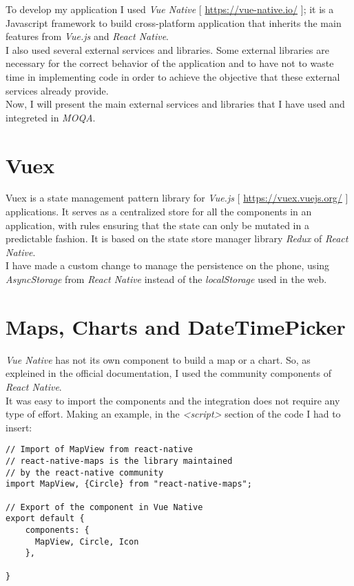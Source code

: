 To develop my application I used \textit{Vue Native} [ \url{https://vue-native.io/} ]; it is a Javascript framework to build cross-platform application that inherits the main features from \textit{Vue.js} and \textit{React Native}.\\ 

I also used several external services and libraries.
Some external libraries are necessary for the correct behavior of the application and to have not to waste time in implementing code in order to achieve the objective that these external services already provide.\\

Now, I will present the main external services and libraries that I have used and integreted in \textit{MOQA}.

\section{Vuex}
Vuex is a state management pattern library for \textit{Vue.js} [ \url{https://vuex.vuejs.org/} ] applications. It serves as a centralized store for all the components in an application, with rules ensuring that the state can only be mutated in a predictable fashion. It is based on the state store manager library \textit{Redux} of \textit{React Native}.\\

I have made a custom change to manage the persistence on the phone, using \textit{AsyncStorage} from \textit{React Native} instead of the \textit{localStorage} used in the web.



\section{Maps, Charts and DateTimePicker}
\textit{Vue Native} has not its own component to build a map or a chart. So, as expleined in the official documentation, I used the community components of \textit{React Native}.\\

It was easy to import the components and the integration does not require any type of effort. Making an example, in the \textit{<script>} section of the code I had to insert:

\medskip
\begin{lstlisting}[style=htmlcssjs]
// Import of MapView from react-native
// react-native-maps is the library maintained
// by the react-native community
import MapView, {Circle} from "react-native-maps";

// Export of the component in Vue Native
export default {
    components: {
      MapView, Circle, Icon
    },
    
}
\end{lstlisting}

